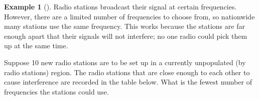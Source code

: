\documentclass[10pt,]{book}
\theoremstyle{plain}
\theoremstyle{definition}
\theoremstyle{definition}
\newtheorem{example}[theorem]{Example}
\theoremstyle{definition}
\theoremstyle{definition}
\numberwithin{equation}{chapter}
\begin{document}
\begin{example}[]\label{example-9}
\hypertarget{p-322}{}%
Radio stations broadcast their signal at certain frequencies. However, there are a limited number of frequencies to choose from, so nationwide many stations use the same frequency. This works because the stations are far enough apart that their signals will not interfere; no one radio could pick them up at the same time.%
\par
\hypertarget{p-323}{}%
Suppose 10 new radio stations are to be set up in a currently unpopulated (by radio stations) region. The radio stations that are close enough to each other to cause interference are recorded in the table below. What is the fewest number of frequencies the stations could use.%
\begin{sidebyside}{1}{0}{0}{0}
\begin{sbspanel}{1}
\end{sbspanel}

\end{sidebyside}
\end{example}
\end{document}

